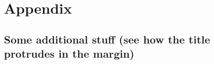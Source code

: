\part*{Appendix}
\appendix

\chapter[Some additional stuff]{Some additional stuff (see how the title protrudes in the margin)}

\lipsum \cite{BringhurstEoTS}
